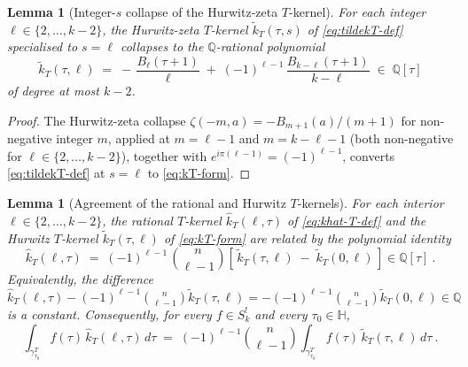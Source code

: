 \documentclass[11pt]{article}
\newtheorem{lemma}[theorem]{Lemma}
\numberwithin{equation}{section}  %
\newcommand{\HH}{\mathbb{H}}
\newcommand{\QQ}{\mathbb{Q}}
\begin{document}
\begin{lemma}[Integer-$s$ collapse of the Hurwitz-zeta $T$-kernel]\label{lem:Hurwitz-collapse}
For each integer $\ell \in \{2, \ldots, k - 2\}$, the Hurwitz-zeta
$T$-kernel $\widetilde{k}_T(\tau, s)$ of \eqref{eq:tildekT-def}
specialised to $s = \ell$ collapses to the $\QQ$-rational polynomial
\begin{equation}\label{eq:kT-form}
  \widetilde{k}_T(\tau, \ell)
  \;=\; -\,\frac{B_\ell(\tau + 1)}{\ell} \;+\; (-1)^{\ell - 1}\,\frac{B_{k - \ell}(\tau + 1)}{k - \ell}
  \;\in\; \QQ[\tau]
\end{equation}
of degree at most $k - 2$.
\end{lemma}

\begin{proof}
The Hurwitz-zeta collapse $\zeta(-m, a) = -B_{m + 1}(a)/(m + 1)$ for
non-negative integer $m$, applied at $m = \ell - 1$ and $m = k - \ell - 1$
(both non-negative for $\ell \in \{2, \ldots, k - 2\}$), together with
$e^{i\pi(\ell - 1)} = (-1)^{\ell - 1}$, converts \eqref{eq:tildekT-def} at
$s = \ell$ to \eqref{eq:kT-form}.
\end{proof}

\begin{lemma}[Agreement of the rational and Hurwitz $T$-kernels]\label{lem:T-piece-equiv}
For each interior $\ell \in \{2, \ldots, k - 2\}$, the rational
$T$-kernel $\widehat{k}_T(\ell, \tau)$ of \eqref{eq:khat-T-def} and the
Hurwitz $T$-kernel $\widetilde{k}_T(\tau, \ell)$ of \eqref{eq:kT-form} are
related by the polynomial identity
\begin{equation}\label{eq:khat-vs-ktilde}
  \widehat{k}_T(\ell, \tau)
  \;=\; (-1)^{\ell - 1}\,\binom{n}{\ell - 1}\!\left[\,\widetilde{k}_T(\tau, \ell) \;-\; \widetilde{k}_T(0, \ell)\,\right]
  \in \QQ[\tau]~.
\end{equation}
Equivalently, the difference
$\widehat{k}_T(\ell, \tau) - (-1)^{\ell - 1}\binom{n}{\ell - 1}\widetilde{k}_T(\tau, \ell)
= -(-1)^{\ell - 1}\binom{n}{\ell - 1}\widetilde{k}_T(0, \ell) \in \QQ$
is a constant.  Consequently, for every $f \in S^!_k$ and every
$\tau_0 \in \HH$,
\begin{equation}\label{eq:T-piece-integral-equiv}
  \int_{\gamma^T_{\tau_0}}\!\! f(\tau)\,\widehat{k}_T(\ell, \tau)\,d\tau
  \;=\; (-1)^{\ell - 1}\binom{n}{\ell - 1}\!\int_{\gamma^T_{\tau_0}}\!\! f(\tau)\,\widetilde{k}_T(\tau, \ell)\,d\tau~.
\end{equation}
\end{lemma}
\end{document}
